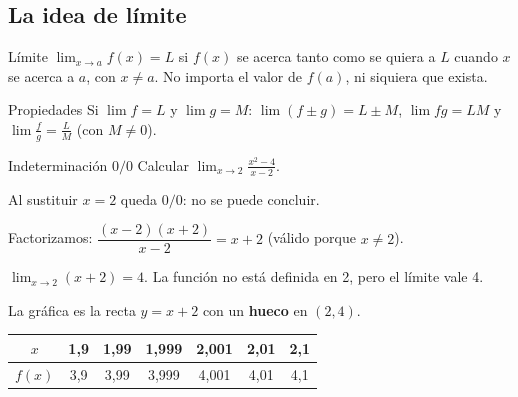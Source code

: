 \subsection{La idea de l\'imite}
\begin{tmdef}{L\'imite}
$\lim_{x\to a}f(x)=L$ si $f(x)$ se acerca tanto como se quiera a $L$ cuando $x$ se acerca a $a$, con $x\neq a$. No importa el valor de $f(a)$, ni siquiera que exista.
\end{tmdef}

\begin{tmdef}{Propiedades}
Si $\lim f=L$ y $\lim g=M$: $\lim(f\pm g)=L\pm M$, $\lim fg=LM$ y $\lim\frac fg=\frac LM$ (con $M\neq0$).
\end{tmdef}

\begin{tmejemplo}{Indeterminaci\'on $0/0$}
Calcular $\displaystyle\lim_{x\to2}\frac{x^2-4}{x-2}$.
\begin{tmpasos}
\item Al sustituir $x=2$ queda $0/0$: no se puede concluir.
\item Factorizamos: $\dfrac{(x-2)(x+2)}{x-2}=x+2$ (v\'alido porque $x\neq2$).
\item $\lim_{x\to2}(x+2)=4$. La funci\'on no est\'a definida en 2, pero el l\'imite vale 4.
\end{tmpasos}
\end{tmejemplo}

\begin{center}
\end{center}
La gr\'afica es la recta $y=x+2$ con un \textbf{hueco} en $(2, 4)$.

\begin{center}
\begin{tabular}{|c|c|c|c|c|c|c|}
\hline
\rowcolor{tmAzulClaro}$x$ & 1,9 & 1,99 & 1,999 & 2,001 & 2,01 & 2,1\\ \hline
$f(x)$ & 3,9 & 3,99 & 3,999 & 4,001 & 4,01 & 4,1\\ \hline
\end{tabular}
\end{center}

